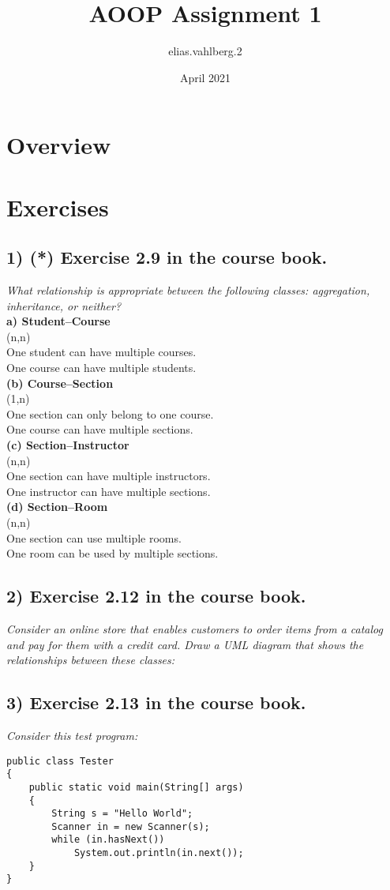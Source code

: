 \documentclass{article}
\title{AOOP Assignment 1 }
\author{elias.vahlberg.2 }
\date{April 2021}
\begin{document}
\maketitle

\section*{Overview}
\section*{Exercises}
\subsection*{1) (*) Exercise 2.9 in the course book.}
\textit{What relationship is appropriate between the following classes: aggregation,
inheritance, or neither?}\\
\textbf{a) Student–Course}\\
\indent (n,n) \\
\indent    One student can have multiple courses.\\
\indent    One course can have multiple students.\\
\textbf{(b) Course–Section}\\
\indent    (1,n)\\
\indent    One section can only belong to one course.\\
\indent    One course can have multiple sections.\\
\textbf{(c) Section–Instructor}\\
\indent    (n,n)\\
\indent    One section can have multiple instructors.\\
\indent    One instructor can have multiple sections.\\
\textbf{(d) Section–Room}\\
\indent    (n,n)\\
\indent    One section can use multiple rooms.\\
\indent    One room can be used by multiple sections.\\
\subsection*{2) Exercise 2.12 in the course book.}
\textit{Consider an online store that enables customers to order items from a catalog and
pay for them with a credit card. Draw a UML diagram that shows the relationships
between these classes:}\\
\subsection*{3) Exercise 2.13 in the course book.}
\textit{Consider this test program:}
\begin{verbatim}
public class Tester
{
    public static void main(String[] args)
    {
        String s = "Hello World";
        Scanner in = new Scanner(s);
        while (in.hasNext())
            System.out.println(in.next());
    }
}
\end{verbatim}
\end{document}
